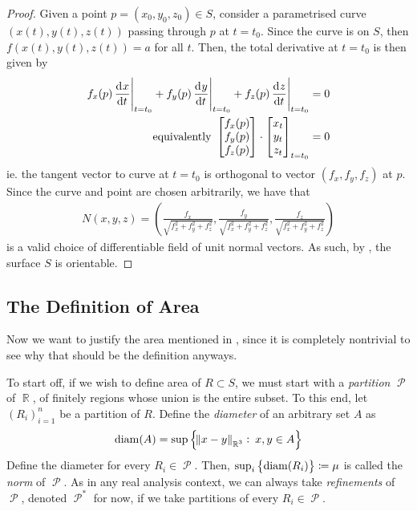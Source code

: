 \documentclass{amsart} %
\theoremstyle{mytheoremstyle}
\theoremstyle{definition}
\numberwithin{equation}{section}
\DeclareMathOperator{\R}{\mathbb{R}}
\DeclareMathOperator{\1}{\mathbbm{1}}
\DeclareMathOperator{\powerset}{\mathcal{P}}
\DeclareMathOperator{\diam}{diam}
\newcommand{\condset}[4]{\left\{ #1  : \: #2 #3 #4 \right\}}
\begin{document}
\begin{proof}
	Given a point $p = (x_0,y_0,z_0) \in S$, consider a parametrised curve $(x(t),y(t),z(t))$ passing through $p$ at $t=t_0$. Since the curve is on $S$, then $f(x(t),y(t),z(t)) = a$ for all $t $. Then, the total derivative at $t=t_0$ is then given by
	\begin{align*}
	f_x (p)  \eval{\dod{x}{t}}_{t=t_0} + f_y (p)  \eval{\dod{y}{t}}_{t=t_0}+ f_z (p)  \eval{\dod{z}{t}}_{t=t_0} &= 0 \\
	\text{ equivalently } \begin{bmatrix*}[c]
	f_x (p) \\ f_y (p) \\ f_z (p) 
	\end{bmatrix*} \cdot \begin{bmatrix*}[c]
	x_t \\ y_t \\ z_t
	\end{bmatrix*}_{t = t_0} &=0
	\end{align*}
	ie. the tangent vector to curve at $t=t_0$ is orthogonal to vector $(f_x,f_y,f_z)$ at $p$. Since the curve and point are chosen arbitrarily, we have that
	\begin{align*}
	N(x,y,z) = \left( \frac{f_x}{\sqrt{f_x^2 + f_y^2 + f_z^2}} , \frac{f_y}{\sqrt{f_x^2 + f_y^2 + f_z^2}} , \frac{f_z}{\sqrt{f_x^2 + f_y^2 + f_z^2}} \right)
	\end{align*}
	is a valid choice of differentiable field of unit normal vectors. As such, by , the surface $S$ is orientable.
\end{proof}




\subsection{The Definition of Area}
Now we want to justify the area mentioned in , since it is completely nontrivial to see why that should be the definition anyways.

To start off, if we wish to define area of $R \subset S$, we must start with a \textit{partition} $\powerset$ of $\R$, of finitely regions whose union is the entire subset. To this end, let $(R_i)_{i=1}^{n}$ be a partition of $R$. Define the \textit{diameter} of an arbitrary set $A$ as
\begin{align}
\label{eqdiam}
\diam(A) = \sup \condset{\norm{x-y}_{\R^3}}{x,y}{\in }{A}
\end{align}
Define the diameter for every $R_i \in \powerset$. Then, $\sup_{i} \set{\diam(R_i)} \coloneqq \mu$ is called the \textit{norm} of $\powerset$. As in any real analysis context, we can always take \textit{refinements} of $\powerset$, denoted $\powerset^*$ for now, if we take partitions of every $R_i \in \powerset$.
\end{document}
